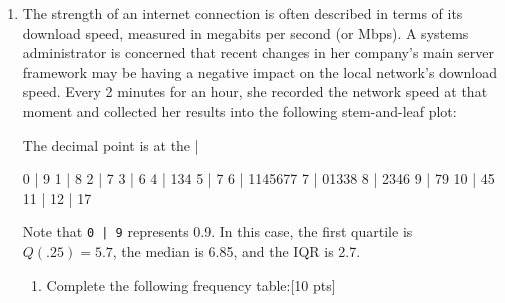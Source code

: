 \documentclass[11pt]{article}\usepackage[]{graphicx}\usepackage[]{color}
\begin{document}
\begin{enumerate}


\item
The strength of an internet connection is often described in terms of its download speed, measured in megabits per second (or Mbps).
A systems administrator is concerned that recent changes in her company's main server framework may be having a negative impact on the local network's download speed.
Every 2 minutes for an hour, she recorded the network speed at that moment and collected her results into the following stem-and-leaf plot:

\begin{Schunk}
\begin{Soutput}
  The decimal point is at the |

   0 | 9
   1 | 8
   2 | 7
   3 | 6
   4 | 134
   5 | 7
   6 | 1145677
   7 | 01338
   8 | 2346
   9 | 79
  10 | 45
  11 | 
  12 | 17
\end{Soutput}
\end{Schunk}

Note that \verb!0 | 9! represents 0.9. In this case, the first quartile is $Q(.25) = 5.7$, the median is 6.85, and the IQR is 2.7.

\begin{enumerate}
  \item Complete the following frequency table:[10 pts] \\


\end{enumerate}
\end{enumerate}
\end{document}
